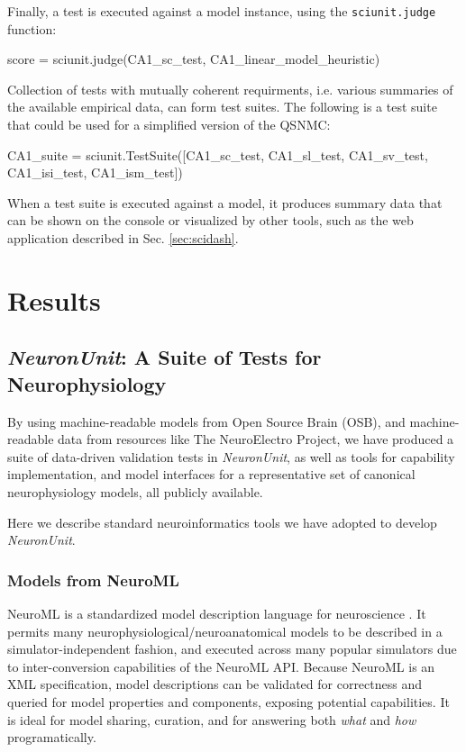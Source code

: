 \documentclass[11pt,letterpaper]{article}
\let\verbx\lstinline
\begin{document}
Finally, a test is executed against a model instance, using the \verbx{sciunit.judge} function:
\begin{python}
score = sciunit.judge(CA1_sc_test, CA1_linear_model_heuristic)
\end{python}

Collection of tests with mutually coherent requirments, i.e. various summaries of the available empirical data, can form test suites.
The following is a test suite that could be used for a simplified version of the QSNMC:  
\begin{python}
CA1_suite = sciunit.TestSuite([CA1_sc_test, CA1_sl_test, CA1_sv_test, CA1_isi_test, CA1_ism_test])
\end{python}
When a test suite is executed against a model, it produces summary data that can be shown on the console or visualized by other tools, such as the web application described in Sec. \ref{sec:scidash}.

\section{Results}

\subsection{\textit{NeuronUnit}: A Suite of Tests for Neurophysiology}\label{sec:neuronunit}
By using machine-readable models from Open Source Brain (OSB), and machine-readable data from resources like The NeuroElectro Project\cite{neuroelectro_url}, we have produced a suite of data-driven validation tests in \textit{NeuronUnit}, as well as tools for capability implementation, and model interfaces for a representative set of canonical neurophysiology models, all publicly available. 

\label{sec:neuronunit_acitivities}
Here we describe standard neuroinformatics tools we have adopted to develop \textit{NeuronUnit}\cite{neurounit_url}.  

\subsubsection{Models from NeuroML}\label{sec:neuroml_models}
NeuroML is a standardized model description language for neuroscience \cite{gleeson_neuroml:_2010}. 
It permits many neurophysiological/neuroanatomical models to be described in a simulator-independent fashion, and executed across many popular simulators due to inter-conversion capabilities of the NeuroML API. 
Because NeuroML is an XML specification, model descriptions can be validated for correctness and queried for model properties and components, exposing potential capabilities. 
It is ideal for model sharing, curation, and for answering both \textit{what} and \textit{how} programatically.  
\end{document}
